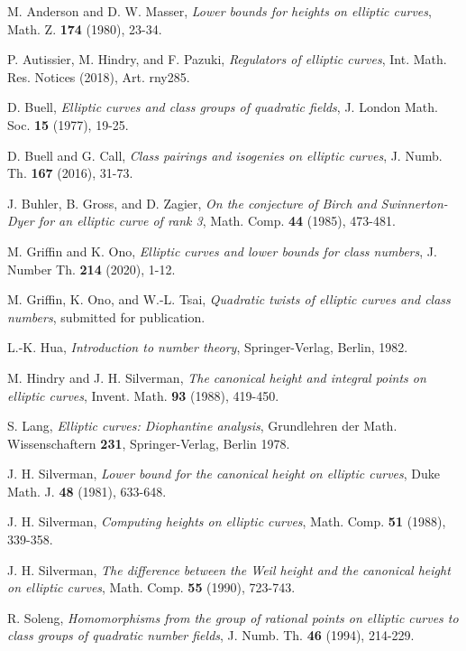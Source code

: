 \documentclass[12pt]{amsart}
\numberwithin{equation}{section}
\begin{document}
\begin{thebibliography}{99}

 M. Anderson and D. W. Masser,
\emph{Lower bounds for heights on elliptic curves},
Math. Z. \textbf{174} (1980), 23-34.

 P. Autissier, M. Hindry, and F. Pazuki, \emph{Regulators of elliptic curves},
Int. Math. Res. Notices (2018), Art. rny285.

 D. Buell, \emph{Elliptic curves and class groups of quadratic fields},
J. London Math. Soc. \textbf{15} (1977), 19-25.

 D. Buell and G. Call, \emph{Class pairings and isogenies on elliptic curves},
J. Numb. Th. \textbf{167} (2016), 31-73.

 J. Buhler, B. Gross, and D. Zagier, \emph{On the conjecture of Birch and Swinnerton-Dyer for an elliptic curve of rank 3}, Math. Comp. \textbf{44} (1985), 473-481.


 M. Griffin and K. Ono, \emph{Elliptic curves and lower bounds for class numbers},
J. Number Th. \textbf{214} (2020), 1-12.

 M. Griffin, K. Ono, and W.-L. Tsai, \emph{Quadratic twists of elliptic curves and class numbers},
submitted for publication.


 L.-K. Hua, \emph{Introduction to number theory}, Springer-Verlag, Berlin, 1982.

 M. Hindry and J. H. Silverman, \emph{The canonical height and integral points on elliptic curves},
Invent. Math. \textbf{93} (1988), 419-450.

 S. Lang, \emph{Elliptic curves: Diophantine analysis}, Grundlehren der Math. Wissenschaftern {\bf 231},
Springer-Verlag, Berlin 1978.



 J. H. Silverman, \emph{Lower bound for the canonical height on elliptic curves}, Duke Math. J.
\textbf{48} (1981), 633-648.

 J. H. Silverman, \emph{Computing heights on elliptic curves}, Math. Comp.
\textbf{51} (1988), 339-358.

 J. H. Silverman, \emph{The difference between the Weil height and the canonical height
on elliptic curves}, Math. Comp. \textbf{55} (1990), 723-743.


 R. Soleng, \emph{Homomorphisms from the group of rational points on elliptic curves
to class groups of quadratic number fields}, J. Numb. Th. \textbf{46} (1994), 214-229.


\end{thebibliography}
\end{document}
